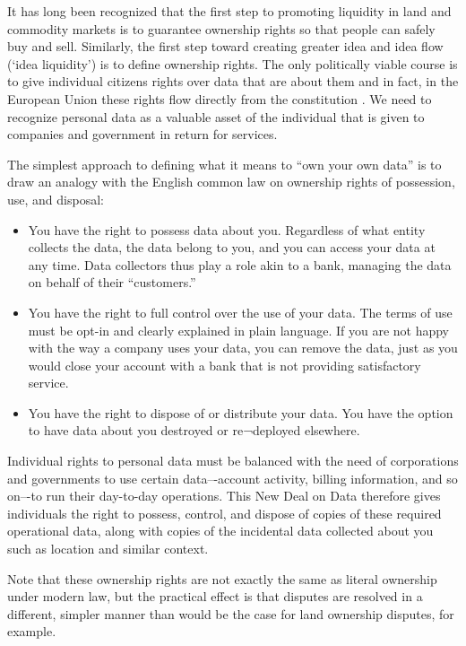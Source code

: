 It has long been recognized that the first step to promoting liquidity in land and commodity markets is to guarantee ownership rights so that people can safely buy and sell.
Similarly, the first step toward creating greater idea and idea flow (`idea liquidity’) is to define ownership rights.
The only politically viable course is to give individual citizens rights over data that are about them and in fact, in the European Union these rights flow directly from the constitution .
We need to recognize personal data as a valuable asset of the individual that is given to companies and government in return for services.

The simplest approach to defining what it means to “own your own data” is to draw an analogy with the English common law on ownership rights of possession, use, and disposal:

\begin{itemize}
\item You have the right to possess data about you. Regardless of what entity collects the data, the data belong to you, and you can access your data at any time. Data collectors thus play a role akin to a bank, managing the data on behalf of their “customers.”

\item You have the right to full control over the use of your data. The terms of use must be opt-in and clearly explained in plain language. If you are not happy with the way a company uses your data, you can remove the data, just as you would close your account with a bank that is not providing satisfactory service.

\item You have the right to dispose of or distribute your data. You have the option to have data about you destroyed or re¬deployed elsewhere.

\end{itemize}

Individual rights to personal data must be balanced with the need of corporations and governments to use certain data–-account activity, billing information, and so on–-to run their day-to-day operations.
This New Deal on Data therefore gives individuals the right to possess, control, and dispose of copies of these required operational data, along with copies of the incidental data collected about you such as location and similar context.

Note that these ownership rights are not exactly the same as literal ownership under modern law, but the practical effect is that disputes are resolved in a different, simpler manner than would be the case for land ownership disputes, for example.

